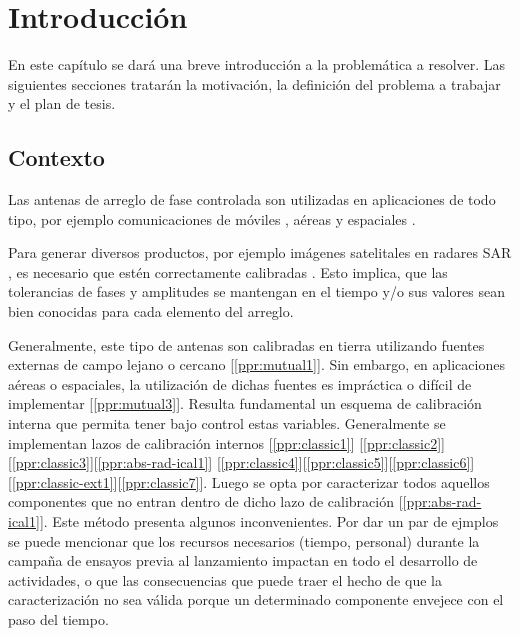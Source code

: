 
\chapter{Introducción} %

\label{ch:introduccion} %

En este capítulo se dará una breve introducción a la problemática a resolver. Las siguientes secciones tratarán la motivación,
la definición del problema a trabajar y el plan de tesis.

\section{Contexto}
    
Las antenas de arreglo de fase controlada \cite{Fenn2000} son utilizadas en aplicaciones de todo tipo, por ejemplo comunicaciones 
de móviles \cite{Chen2012}, aéreas 
								   \cite{ppr:punc-ext1} y espaciales \cite{Shimada1995}\cite{Makhoul2012}. 

Para generar diversos productos, por ejemplo imágenes satelitales en radares SAR 
																				 \cite{ppr:puncTrgt1}, es necesario que estén 
correctamente calibradas 
						 \cite{ppr:classic1}\cite{ppr:classic2}\cite{ppr:classic3}. Esto implica, que las tolerancias de
fases y amplitudes se mantengan en el tiempo y/o sus valores sean bien conocidas
para cada elemento del arreglo.

Generalmente, este tipo de antenas son calibradas en tierra utilizando fuentes 
externas de campo lejano o cercano [\ref{ppr:mutual1}]. Sin embargo, en 
aplicaciones aéreas o espaciales, la utilización de dichas fuentes es impráctica
o difícil de implementar [\ref{ppr:mutual3}]. Resulta fundamental un esquema de
calibración interna que permita tener bajo control estas variables. Generalmente
se implementan lazos de calibración internos [\ref{ppr:classic1}]
[\ref{ppr:classic2}][\ref{ppr:classic3}][\ref{ppr:abs-rad-ical1}]
[\ref{ppr:classic4}][\ref{ppr:classic5}][\ref{ppr:classic6}]
[\ref{ppr:classic-ext1}][\ref{ppr:classic7}]\cite{Makhoul2012}. 
Luego se opta por caracterizar todos aquellos componentes que no entran dentro 
de dicho lazo de calibración [\ref{ppr:abs-rad-ical1}].
Este método presenta algunos inconvenientes. Por dar un par de ejmplos se puede
mencionar que los recursos necesarios (tiempo, personal) durante la campaña de 
ensayos previa al lanzamiento impactan en todo el desarrollo de actividades, o
que las consecuencias que puede traer el hecho de que la caracterización no sea
válida porque un determinado componente envejece con el paso del tiempo.

